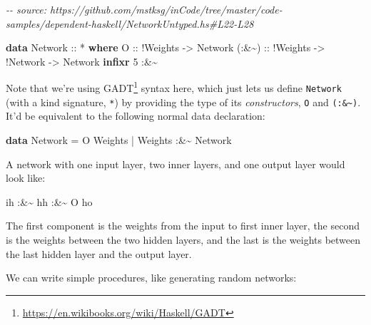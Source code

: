 \documentclass[]{article}
\newenvironment{Shaded}{}{}
\newcommand{\CommentTok}[1]{\textcolor[rgb]{0.38,0.63,0.69}{\textit{#1}}}
\newcommand{\DataTypeTok}[1]{\textcolor[rgb]{0.56,0.13,0.00}{#1}}
\newcommand{\DecValTok}[1]{\textcolor[rgb]{0.25,0.63,0.44}{#1}}
\newcommand{\KeywordTok}[1]{\textcolor[rgb]{0.00,0.44,0.13}{\textbf{#1}}}
\newcommand{\NormalTok}[1]{#1}
\newcommand{\OperatorTok}[1]{\textcolor[rgb]{0.40,0.40,0.40}{#1}}
\newcommand{\OtherTok}[1]{\textcolor[rgb]{0.00,0.44,0.13}{#1}}
\renewcommand{\href}[2]{#2\footnote{\url{#1}}}
\begin{document}
\begin{Shaded}
\begin{Highlighting}[]
\CommentTok{{-}{-} source: https://github.com/mstksg/inCode/tree/master/code{-}samples/dependent{-}haskell/NetworkUntyped.hs\#L22{-}L28}

\KeywordTok{data} \DataTypeTok{Network}\OtherTok{ ::} \OperatorTok{*} \KeywordTok{where}
    \DataTypeTok{O}\OtherTok{     ::} \OperatorTok{!}\DataTypeTok{Weights}
          \OtherTok{{-}>} \DataTypeTok{Network}
\OtherTok{    (:\&\textasciitilde{}) ::} \OperatorTok{!}\DataTypeTok{Weights}
          \OtherTok{{-}>} \OperatorTok{!}\DataTypeTok{Network}
          \OtherTok{{-}>} \DataTypeTok{Network}
\KeywordTok{infixr} \DecValTok{5} \OperatorTok{:\&\textasciitilde{}}
\end{Highlighting}
\end{Shaded}

Note that we're using \href{https://en.wikibooks.org/wiki/Haskell/GADT}{GADT}
syntax here, which just lets us define \texttt{Network} (with a kind signature,
\texttt{*}) by providing the type of its \emph{constructors}, \texttt{O} and
\texttt{(:\&\textasciitilde{})}. It'd be equivalent to the following normal data
declaration:

\begin{Shaded}
\begin{Highlighting}[]
\KeywordTok{data} \DataTypeTok{Network} \OtherTok{=} \DataTypeTok{O} \DataTypeTok{Weights}
             \OperatorTok{|} \DataTypeTok{Weights} \OperatorTok{:\&\textasciitilde{}} \DataTypeTok{Network}
\end{Highlighting}
\end{Shaded}

A network with one input layer, two inner layers, and one output layer would
look like:

\begin{Shaded}
\begin{Highlighting}[]
\NormalTok{ih }\OperatorTok{:\&\textasciitilde{}}\NormalTok{ hh }\OperatorTok{:\&\textasciitilde{}} \DataTypeTok{O}\NormalTok{ ho}
\end{Highlighting}
\end{Shaded}

The first component is the weights from the input to first inner layer, the
second is the weights between the two hidden layers, and the last is the weights
between the last hidden layer and the output layer.

We can write simple procedures, like generating random networks:
\end{document}
